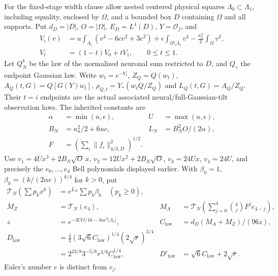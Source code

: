 \documentclass[11pt]{article}
\theoremstyle{plain}
\theoremstyle{definition}
\theoremstyle{remark}
\begin{document}
For the fixed-stage width clause allow nested centered physical squares
$\Lambda_0\subset\Lambda_1$, including equality, enclosed by $\Omega$,
and a bounded box $D$ containing $\Omega$ and all supports.
Put $d_D=|D|$, $O=|\Omega|$, $E_D=L^4(D)$, $Y=\mathcal O_f$, and
\begin{align*}
 V_i(v)&=u\int_{\Lambda_i}(v^4-6cv^2+3c^2)
       +\epsilon\int_{\Omega\setminus\Lambda_i}v^4
       -\frac{\kappa_a^2}{2}\int_\Omega v^2,\\
 V_t&=(1-t)V_0+tV_1,\qquad0\le t\le1.
\end{align*}
Let $Q_N^b$ be the law of the normalized neuronal sum restricted to $D$,
and $Q_\gamma$ the endpoint Gaussian law. Write
$w_t=e^{-V_t}$, $Z_Q=Q(w_t)$,
$A_Q(t,G)=Q[G(Y)w_t]$, $\rho_{Q,t}=Y_*(w_tQ/Z_Q)$ and
$L_Q(t,G)=A_Q/Z_Q$. Their $t=i$ endpoints are the actual associated
neural/full-Gaussian-tilt observation laws. The inherited constants are
\begin{align*}
 \alpha&=\min(u,\epsilon),&U&=\max(u,\epsilon),\\
 B_N&=\kappa_a^2/2+6uc,&L_N&=B_N^2O/(2\alpha),\\
 F&=\left(\sum_i\|f_i\|_{4/3,D}^2\right)^{1/2}.
\end{align*}
Use $v_1=4Ux^3+2B_N\sqrt O\,x$, $v_2=12Ux^2+2B_N\sqrt O$,
$v_3=24Ux$, $v_4=24U$, and precisely the $e_0,\ldots,e_4$ Bell
polynomials displayed earlier. With $\beta_0=1$,
$\beta_k=(k/(2\alpha e))^{k/4}$ for $k>0$, put
\begin{align*}
 \mathcal T_N\left(\sum p_kx^k\right)&=e^{L_N}\sum p_k\beta_k\quad(p_k\ge0),\\
 M_Z&=\mathcal T_N(e_4),&
 M_A&=\mathcal T_N\left(\sum_{j=0}^4\binom4jF^je_{4-j}\right),\\
 z&=e^{-3UO/16-3uc^2|\Lambda_1|},&
 C_{\mathrm{law}}&=d_D(M_A+M_Z)/(96z),\\
 D_{\mathrm{law}}&=\tfrac43(3\sqrt6C_{\mathrm{law}})^{1/4}(2\sqrt r)^{3/4}\\
 &=2^{23/8}3^{-5/8}r^{3/8}C_{\mathrm{law}}^{1/4},&
 D'_{\mathrm{law}}&=\sqrt6C_{\mathrm{law}}+2\sqrt r.
\end{align*}
Euler's number $e$ is distinct from $e_j$.
\end{document}
